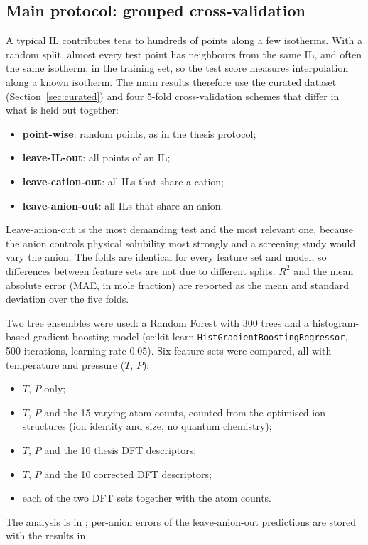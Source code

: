 \subsection{Main protocol: grouped cross-validation}
\label{sec:grouped-method}
A typical IL contributes tens to hundreds of points along a few isotherms. With a random split, almost every test point has neighbours from the same IL, and often the same isotherm, in the training set, so the test score measures interpolation along a known isotherm. The main results therefore use the curated dataset (Section~\ref{sec:curated}) and four 5-fold cross-validation schemes that differ in what is held out together\cite{meredig2018can, cawley2010overfitting}:
\begin{itemize}
    \item \textbf{point-wise}: random points, as in the thesis protocol;
    \item \textbf{leave-IL-out}: all points of an IL;
    \item \textbf{leave-cation-out}: all ILs that share a cation;
    \item \textbf{leave-anion-out}: all ILs that share an anion.
\end{itemize}
Leave-anion-out is the most demanding test and the most relevant one, because the anion controls physical \co{} solubility most strongly\cite{cadena2004why, anthony2005anion} and a screening study would vary the anion. The folds are identical for every feature set and model, so differences between feature sets are not due to different splits. $R^2$ and the mean absolute error (MAE, in mole fraction) are reported as the mean and standard deviation over the five folds.

Two tree ensembles were used: a Random Forest with 300 trees and a histogram-based gradient-boosting model\cite{ke2017lightgbm} (scikit-learn \texttt{HistGradientBoostingRegressor}, 500 iterations, learning rate 0.05). Six feature sets were compared, all with temperature and pressure ($T$, $P$):
\begin{itemize}
    \item $T$, $P$ only;
    \item $T$, $P$ and the 15 varying atom counts, counted from the optimised ion structures (ion identity and size, no quantum chemistry);
    \item $T$, $P$ and the 10 thesis DFT descriptors;
    \item $T$, $P$ and the 10 corrected DFT descriptors;
    \item each of the two DFT sets together with the atom counts.
\end{itemize}
The analysis is in ; per-anion errors of the leave-anion-out predictions are stored with the results in .
